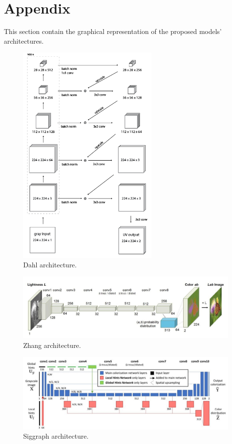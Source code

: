 \documentclass[10pt,twocolumn,letterpaper]{article}
\begin{document}







\clearpage
\onecolumn
{\small


}

\section*{Appendix}
This section contain the graphical representation of the proposed models' architectures.

\begin{figure}[htbp]
	\centering
	\includegraphics[width=7cm]{diagram dahl.jpg}
	\caption{Dahl architecture.}
	\label{fig:dahl}
\end{figure}

\begin{figure}[htbp]
	\centering
	\includegraphics[width=15cm]{diagram zhang}
	\caption{Zhang architecture.}
	\label{fig:zh}
\end{figure}

\begin{figure}[htbp]
	\centering
	\includegraphics[width=15cm]{diagram siggraph}
	\caption{Siggraph architecture.}
	\label{fig:si}
\end{figure}
\end{document}
